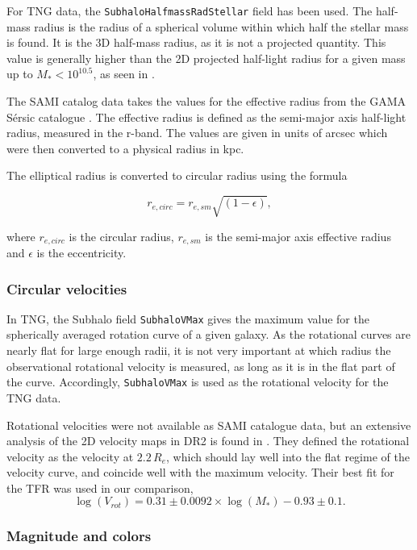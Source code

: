 For TNG data, the \texttt{SubhaloHalfmassRadStellar} field has been used. The half-mass radius is the radius of a spherical volume within which half the stellar mass is found. It is the 3D half-mass radius, as it is not a projected quantity. This value is generally higher than the 2D projected half-light radius for a given mass up to $M_{*} < 10^{10.5}$, as seen in \parencite{Genel2017}.

The SAMI catalog data takes the values for the effective radius from the GAMA Sérsic catalogue \parencite{Kelvin2012}. The effective radius is defined as the semi-major axis half-light radius, measured in the r-band. The values are given in units of arcsec which were then converted to a physical radius in kpc.


The elliptical radius is converted to circular radius using the formula

\begin{equation}
   r_{e, circ} = r_{e,sm}\sqrt{(1-\epsilon)},
\end{equation}

where $r_{e, circ}$ is the circular radius, $r_{e,sm}$ is the semi-major axis effective radius and $\epsilon$ is the eccentricity.

\subsubsection{Circular velocities}
In TNG, the Subhalo field \texttt{SubhaloVMax} gives the maximum value for the spherically averaged rotation curve of a given galaxy. As the rotational curves are nearly flat for large enough radii, it is not very important at which radius the observational rotational velocity is measured, as long as it is in the flat part of the curve. Accordingly, \texttt{SubhaloVMax} is used as the rotational velocity for the TNG data.

Rotational velocities were not available as SAMI catalogue data, but an extensive analysis of the 2D velocity maps in DR2 is found in \textcite{Bloom2017}. They defined the rotational velocity as the velocity at $2.2\, R_e$, which should lay well into the flat regime of the velocity curve, and coincide well with the maximum velocity. Their best fit for the TFR was used in our comparison, 
\begin{equation}
	\log(V_{rot}) = 0.31 \pm 0.0092 \times \log(M_*)-0.93 \pm 0.1.
\end{equation}

\subsubsection{Magnitude and colors}